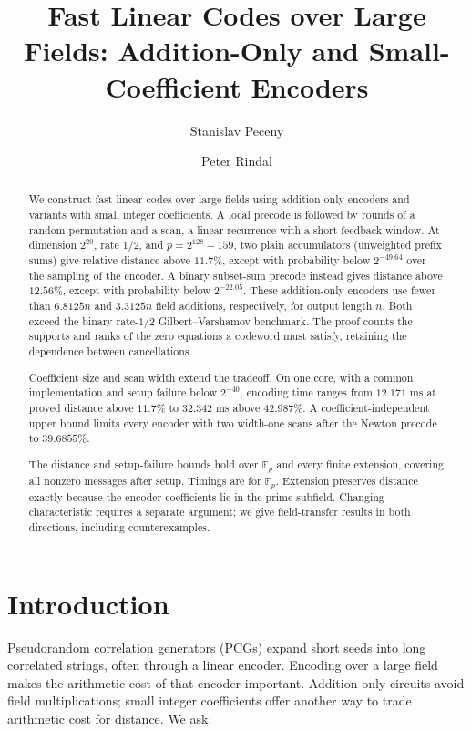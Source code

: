 \documentclass[runningheads,envcountsame,envcountsect]{llncs}
\title{Fast Linear Codes over Large Fields: Addition-Only and Small-Coefficient Encoders}
\author{Stanislav Peceny \and Peter Rindal}
\institute{}
\newcommand{\F}{\mathbb F}
\begin{document}
\raggedbottom
\maketitle

\begin{abstract}
We construct fast linear codes over large fields using addition-only
encoders and variants with small integer coefficients. A local precode
is followed by rounds of a random permutation and a scan, a linear
recurrence with a short feedback window. At dimension $2^{20}$,
rate $1/2$, and $p=2^{128}-159$, two plain accumulators (unweighted
prefix sums) give relative distance above $11.7\%$, except with
probability below $2^{-49.64}$ over the sampling of the encoder.
A binary subset-sum precode instead gives distance above $12.56\%$,
except with probability below $2^{-22.05}$. These addition-only encoders
use fewer than $6.8125n$ and $3.3125n$ field additions, respectively,
for output length $n$. Both exceed the binary rate-$1/2$
Gilbert--Varshamov benchmark. The proof counts the supports and ranks of
the zero equations a codeword must satisfy, retaining the dependence
between cancellations.

Coefficient size and scan width extend the tradeoff. On one core, with
a common implementation and setup failure below $2^{-40}$, encoding
time ranges from $12.171$ ms at proved distance above $11.7\%$ to
$32.342$ ms above $42.987\%$.
A coefficient-independent upper bound limits every encoder with two
width-one scans after the Newton precode to $39.6855\%$.

The distance and setup-failure bounds hold over $\F_p$ and every finite
extension, covering all nonzero messages after setup. Timings are for
$\F_p$. Extension preserves distance exactly because the encoder
coefficients lie in the prime subfield. Changing characteristic requires
a separate argument; we give field-transfer results in both directions,
including counterexamples.
\end{abstract}

\section{Introduction}\label{sec:introduction}

Pseudorandom correlation generators (PCGs) expand short seeds into long
correlated strings, often through a linear encoder. Encoding over a large
field makes the arithmetic cost of that encoder important. Addition-only
circuits avoid field multiplications; small integer coefficients offer
another way to trade arithmetic cost for distance. We ask:
\end{document}

